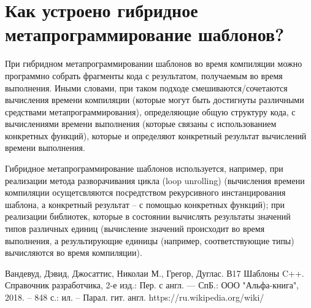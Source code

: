 \documentclass[a4paper,12pt]{article}	%
\begin{document}
\newpage

\section{Как устроено гибридное метапрограммирование шаблонов?}
	
	При гибридном метапрограммировании шаблонов во время компиляции можно программно собрать фрагменты кода с результатом, получаемым во время выполнения. Иными словами, при таком подходе смешиваются/сочетаются вычисления времени компиляции (которые могут быть достигнуты различными средствами метапрограммирования), определяющие общую структуру кода, с вычислениями времени выполнения (которые связаны с использованием конкретных функций), которые и определяют конкретный результат вычислений времени выполнения.
	
	Гибридное метапрограммирование шаблонов используется, например, при реализации метода разворачивания цикла (loop unrolling) (вычисления времени компиляции осущетсвляются посредтством рекурсивного инстанцирования шаблона, а конкретный результат -- с помощью конкретных функций); при реализации библиотек, которые в состоянии вычислять результаты значений типов различных единиц (вычисление значений происходит во время выполнения, а результирующие единицы (например, соответствующие типы) вычисляются во время компиляции).
	
\newpage


 
	\begin{thebibliography}{}
	
		 Вандевуд, Дэвид, Джосаттис, Николаи М., Грегор, Дуглас. В17 Шаблоны C++. Справочник разработчика, 2-е изд.: Пер. с англ. — СпБ.: ООО "Альфа-книга", 2018. -- 848 с.: ил. -- Парал. гит. англ.
		 https://ru.wikipedia.org/wiki/
		
	\end{thebibliography}
\end{document}
